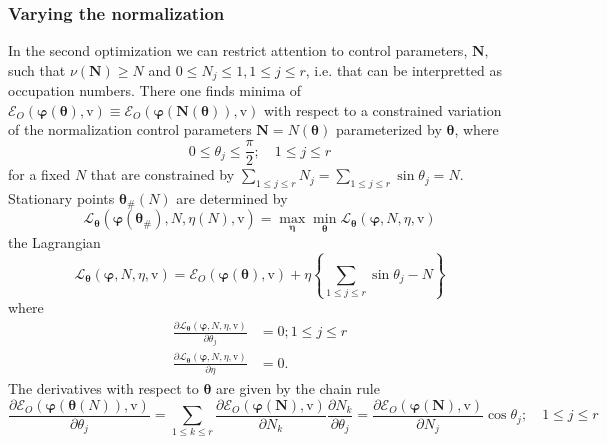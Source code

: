 \documentclass[aps,preprint]{revtex4}%
\begin{document}
\subsubsection{Varying the normalization}

In the second optimization we can restrict attention to control parameters,
$\boldsymbol{N},$ such that $\nu\left(  \boldsymbol{N}\right)  \geq N$ and
$0\leq N_{j}\leq1,1\leq j\leq r$, i.e. that can be interpretted as occupation
numbers. There one finds minima of $\mathcal{E}_{O}\left(  \boldsymbol{\varphi
\left(  \boldsymbol{\theta}\right)  ,}\mathrm{v}\right)  \equiv\mathcal{E}%
_{O}\left(  \boldsymbol{\varphi\left(  N\left(  \boldsymbol{\theta}\right)
\right)  ,}\mathrm{v}\right)  $ with respect to a constrained variation of the
normalization control parameters $\boldsymbol{N}=N\left(  \boldsymbol{\theta
}\right)  $ parameterized by $\boldsymbol{\theta}$, where
\[
0\leq\theta_{j}\leq\frac{\pi}{2};\quad1\leq j\leq r
\]
for a fixed $N$ that are constrained by $\sum_{1\leq j\leq r}N_{j}=\sum_{1\leq
j\leq r}\sin\theta_{j}=N$. Stationary points $\boldsymbol{\theta}_{\#}\left(
N\right)  $ are determined by
\begin{equation}
\mathcal{L}_{\boldsymbol{\theta}}\left(  \boldsymbol{\varphi\left(
\boldsymbol{\theta}_{\#}\right)  ,}N\boldsymbol{,}\eta\left(  N\right)
\boldsymbol{,}\mathrm{v}\right)  =\max_{\boldsymbol{\eta}}\min
_{\boldsymbol{\theta}}\mathcal{L}_{\boldsymbol{\theta}}\left(
\boldsymbol{\varphi,}N\boldsymbol{,}\eta\boldsymbol{,}\mathrm{v}\right)
\end{equation}
the Lagrangian
\begin{equation}
\mathcal{L}_{\boldsymbol{\theta}}\left(  \boldsymbol{\varphi,}N\boldsymbol{,}%
\eta\boldsymbol{,}\mathrm{v}\right)  =\mathcal{E}_{O}\left(
\boldsymbol{\varphi}\left(  \boldsymbol{\theta}\right)  \boldsymbol{,}%
\mathrm{v}\right)  +\eta\left\{  \sum_{1\leq j\leq r}\sin\theta_{j}-N\right\}
\end{equation}
where
\begin{align}
\frac{\partial\mathcal{L}_{\boldsymbol{\theta}}\left(  \boldsymbol{\varphi
,}N\boldsymbol{,}\eta\boldsymbol{,}\mathrm{v}\right)  }{\partial\theta_{j}}
&  =0;1\leq j\leq r\\
\frac{\partial\mathcal{L}_{\boldsymbol{\theta}}\left(  \boldsymbol{\varphi
,}N\boldsymbol{,}\eta\boldsymbol{,}\mathrm{v}\right)  }{\partial\eta}  &
=0.\nonumber
\end{align}
The derivatives with respect to $\boldsymbol{\theta}$ are given by the chain
rule
\begin{equation}
\frac{\partial\mathcal{E}_{O}\left(  \boldsymbol{\varphi}\left(
\boldsymbol{\theta}\left(  N\right)  \right)  \boldsymbol{,}\mathrm{v}\right)
}{\partial\theta_{j}}=\sum\limits_{1\leq k\leq r}\frac{\partial\mathcal{E}%
_{O}\left(  \boldsymbol{\varphi}\left(  \boldsymbol{N}\right)  \boldsymbol{,}%
\mathrm{v}\right)  }{\partial N_{k}}\frac{\partial N_{k}}{\partial\theta_{j}%
}=\frac{\partial\mathcal{E}_{O}\left(  \boldsymbol{\varphi}\left(
\boldsymbol{N}\right)  \boldsymbol{,}\mathrm{v}\right)  }{\partial N_{j}}%
\cos\theta_{j};\quad1\leq j\leq r \label{ThetaDer}%
\end{equation}
\end{document}
